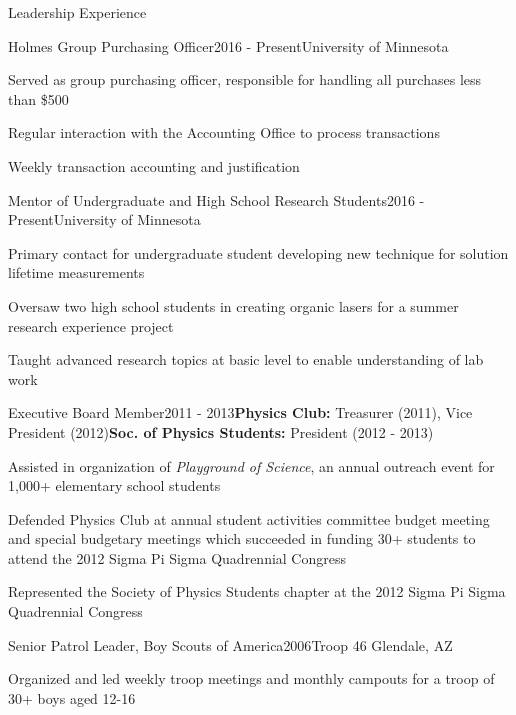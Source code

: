 \documentclass{resume} %
\begin{document}

\begin{rSection}{Leadership Experience}

\begin{rSubsection}{Holmes Group Purchasing Officer}{2016 - Present}{University of Minnesota}{}
\item Served as group purchasing officer, responsible for handling all purchases less than \$500
\item Regular interaction with the Accounting Office to process transactions
\item Weekly transaction accounting and justification
\end{rSubsection}

\begin{rSubsection}{Mentor of Undergraduate and High School Research Students}{2016 - Present}{University of Minnesota}{}
\item Primary contact for undergraduate student developing new technique for solution lifetime measurements
\item Oversaw two high school students in creating organic lasers for a summer research experience project
\item Taught advanced research topics at basic level to enable understanding of lab work
\end{rSubsection}

\begin{rSubsection}{Executive Board Member}{2011 - 2013}{\textbf{Physics Club:} Treasurer (2011), Vice President (2012)}{\textbf{Soc. of Physics Students:} President (2012 - 2013)}
\item Assisted in organization of {\em Playground of Science}, an annual outreach event for 1,000+ elementary school students
\item Defended Physics Club at annual student activities committee budget meeting and special budgetary meetings which succeeded in funding 30+ students to attend the 2012 Sigma Pi Sigma Quadrennial Congress
\item Represented the Society of Physics Students chapter at the 2012 Sigma Pi Sigma Quadrennial Congress
\end{rSubsection}

\begin{rSubsection}{Senior Patrol Leader, Boy Scouts of America}{2006}{Troop 46 Glendale, AZ}{}
\item Organized and led weekly troop meetings and monthly campouts for a troop of 30+ boys aged 12-16
\end{rSubsection}

\end{rSection}
\end{document}
